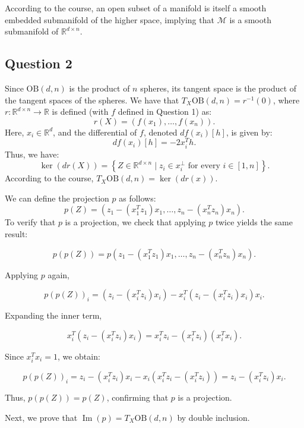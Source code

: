 \documentclass{article}
\begin{document}
According to the course, an open subset of a manifold is itself a smooth embedded submanifold of the higher space, implying that $\mathcal{M}$ is a smooth submanifold of $\mathbb{R}^{d\times n}$. %

\subsection*{Question 2}
Since $\text{OB}(d, n)$ is the product of $n$ spheres, its tangent space is the product of the tangent spaces of the spheres. We have that \( T_X \text{OB}(d, n) = r^{-1}(0) \), where \( r: \mathbb{R}^{d \times n} \to \mathbb{R} \) is defined (with \( f \) defined in Question 1) as:
\[
r(X) = \left( f(x_1), \dots, f(x_n) \right).
\]
Here, \( x_i \in \mathbb{R}^d \), and the differential of \( f \), denoted \( df(x_i)[h] \), is given by:
\[
df(x_i)[h] = -2 x_i^T h.
\]
Thus, we have:
\[
\ker \left( dr(X) \right) = \left\{ Z \in \mathbb{R}^{d \times n} \mid z_i \in x_i^\perp \text{ for every } i \in [1, n] \right\}.
\]
According to the course, \( T_X \text{OB}(d, n) = \ker \left( dr(x) \right) \).




We can define the projection \( p \) as follows:
\[
p(Z) = \left( z_1 - (x_1^T z_1) x_1, \dots, z_n - (x_n^T z_n) x_n \right).
\]
To verify that \( p \) is a projection, we check that applying \( p \) twice yields the same result:

\[
p(p(Z)) = p \left( z_1 - (x_1^T z_1) x_1, \dots, z_n - (x_n^T z_n) x_n \right).
\]

Applying \( p \) again,

\[
p(p(Z))_i = \left( z_i - (x_i^T z_i) x_i \right) - x_i^T \left( z_i - (x_i^T z_i) x_i \right) x_i.
\]

Expanding the inner term,

\[
x_i^T \left( z_i - (x_i^T z_i) x_i \right) = x_i^T z_i - (x_i^T z_i) (x_i^T x_i).
\]

Since \( x_i^T x_i = 1 \), we obtain:

\[
p(p(Z))_i = z_i - (x_i^T z_i) x_i - x_i \left( x_i^T z_i - (x_i^T z_i) \right) = z_i - (x_i^T z_i) x_i.
\]

Thus, \( p(p(Z)) = p(Z) \), confirming that \( p \) is a projection.

Next, we prove that \( \operatorname{Im}(p) = T_X \text{OB}(d, n) \) by double inclusion.
\end{document}
